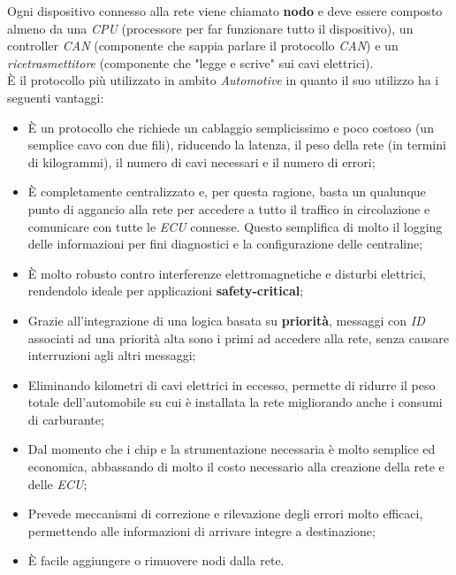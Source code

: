 Ogni dispositivo connesso alla rete viene chiamato \textbf{nodo} e deve essere composto almeno da una \emph{CPU} (processore per far funzionare tutto il dispositivo), un controller \emph{CAN} (componente che sappia parlare il protocollo \emph{CAN}) e un \emph{ricetrasmettitore} (componente che "legge e scrive" sui cavi elettrici).\\
È il protocollo più utilizzato in ambito \emph{Automotive} in quanto il suo utilizzo ha i seguenti vantaggi:

\begin{itemize}
    \item È un protocollo che richiede un cablaggio semplicissimo e poco costoso (un semplice cavo con due fili), riducendo la latenza, il peso della rete (in termini di kilogrammi), il numero di cavi necessari e il numero di errori;
    \item È completamente centralizzato e, per questa ragione, basta un qualunque punto di aggancio alla rete per accedere a tutto il traffico in circolazione e comunicare con tutte le \emph{ECU} connesse. Questo semplifica di molto il logging delle informazioni per fini diagnostici e la configurazione delle centraline;
    \item È molto robusto contro interferenze elettromagnetiche e disturbi elettrici, rendendolo ideale per applicazioni \textbf{safety-critical};
    \item Grazie all'integrazione di una logica basata su \textbf{priorità}, messaggi con \emph{ID} associati ad una priorità alta sono i primi ad accedere alla rete, senza causare interruzioni agli altri messaggi;
    \item Eliminando kilometri di cavi elettrici in eccesso, permette di ridurre il peso totale dell'automobile su cui è installata la rete migliorando anche i consumi di carburante;
    \item Dal momento che i chip e la strumentazione necessaria è molto semplice ed economica, abbassando di molto il costo necessario alla creazione della rete e delle \emph{ECU};
    \item Prevede meccanismi di correzione e rilevazione degli errori molto efficaci, permettendo alle informazioni di arrivare integre a destinazione;
    \item È facile aggiungere o rimuovere nodi dalla rete. \cite{can_bus_dewesoft}
\end{itemize}

